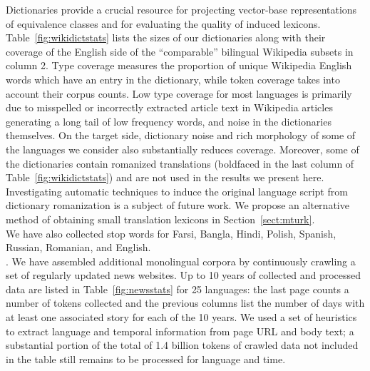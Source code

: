 \documentclass{article}
\newcommand{\mtodo}[1]{}
\newcommand{\secref}[1]{Section~\ref{#1}}
\newcommand{\tabref}[1]{Table~\ref{#1}}
\begin{document}

  Dictionaries provide a crucial resource for projecting vector-base representations of equivalence classes and for evaluating the quality of induced lexicons.  \tabref{fig:wikidictstats} lists the sizes of our dictionaries along with their coverage of the English side of the ``comparable'' bilingual Wikipedia subsets in column 2.  Type coverage measures the proportion of unique Wikipedia English words which have an entry in the dictionary, while token coverage takes into account their corpus counts. Low type coverage for most languages is primarily due to misspelled or incorrectly extracted article text in Wikipedia articles generating a long tail of low frequency words, and noise in the dictionaries themselves.  On the target side, dictionary noise and rich morphology of some of the languages we consider also substantially reduces coverage.  Moreover, some of the dictionaries contain romanized translations (boldfaced in the last column of \tabref{fig:wikidictstats}) and are not used in the results we present here.  Investigating automatic techniques to induce the original language script from dictionary romanization is a subject of future work.  We propose an alternative method of obtaining small translation lexicons in \secref{sect:mturk}.\\ 

 We have also collected stop words for Farsi, Bangla, Hindi, Polish, Spanish, Russian, Romanian, and English.\\

.  We have assembled additional monolingual corpora by continuously crawling a set of regularly updated news websites.  Up to 10 years of collected and processed data are listed in \tabref{fig:newsstats} for 25 languages: the last page counts a number of tokens collected and the previous columns list the number of days with at least one associated story for each of the 10 years.  We used a set of heuristics to extract language and temporal information from page URL and body text; a substantial portion of the total of 1.4 billion tokens of crawled data not included in the table still remains to be processed for language and time.\\
\end{document}
